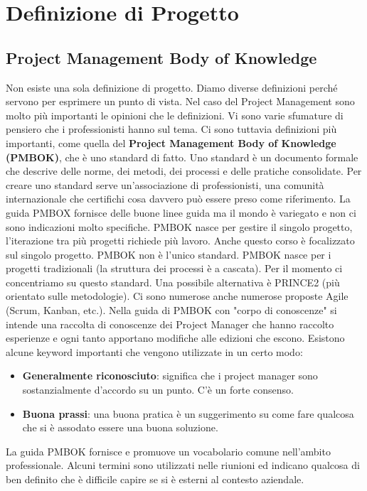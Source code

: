\section{Definizione di Progetto}
\subsection{Project Management Body of Knowledge}
Non esiste una sola definizione di progetto. Diamo diverse definizioni perché servono per esprimere un punto di vista. Nel caso del Project Management sono molto più importanti le opinioni che le definizioni. Vi sono varie sfumature di pensiero che i professionisti hanno sul tema. Ci sono tuttavia definizioni più importanti, come quella del \textbf{Project Management Body of Knowledge (PMBOK)}, che è uno standard di fatto. Uno standard è un documento formale che descrive delle norme, dei metodi, dei processi e delle pratiche consolidate. Per creare uno standard serve un'associazione di professionisti, una comunità internazionale che certifichi cosa davvero può essere preso come riferimento.\newline
La guida PMBOX fornisce delle buone linee guida ma il mondo è variegato e non ci sono indicazioni molto specifiche.\newline
PMBOK nasce per gestire il singolo progetto, l'iterazione tra più progetti richiede più lavoro. Anche questo corso è focalizzato sul singolo progetto.\newline
PMBOK non è l'unico standard. PMBOK nasce per i progetti tradizionali (la struttura dei processi è a cascata). Per il momento ci concentriamo su questo standard. Una possibile alternativa è PRINCE2 (più orientato sulle metodologie). Ci sono numerose anche numerose proposte Agile (Scrum, Kanban, etc.).\newline\newline
Nella guida di PMBOK con "corpo di conoscenze" si intende una raccolta di conoscenze dei Project Manager che hanno raccolto esperienze e ogni tanto apportano modifiche alle edizioni che escono.\newline
Esistono alcune keyword importanti che vengono utilizzate in un certo modo:
\begin{itemize}
	\item \textbf{Generalmente riconosciuto}: significa che i project manager sono sostanzialmente d'accordo su un punto. C'è un forte consenso.
	\item \textbf{Buona prassi}: una buona pratica è un suggerimento su come fare qualcosa che si è assodato essere una buona soluzione.
\end{itemize}
La guida PMBOK fornisce e promuove un vocabolario comune nell'ambito professionale. Alcuni termini sono utilizzati nelle riunioni ed indicano qualcosa di ben definito che è difficile capire se si è esterni al contesto aziendale.\newline
